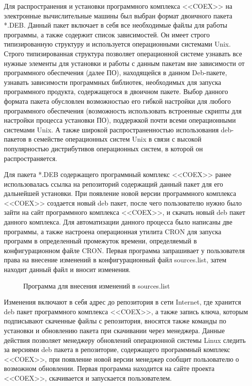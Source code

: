 Для распространения и установки программного комплекса <<COEX>> на электронные вычислительные машины был выбран формат двоичного пакета *.DEB. Данный пакет включает в себя все необходимые файлы для работы программы, а также содержит список зависимостей. Он имеет строго типизированную структуру и используется операционными системами Unix. Строго типизированная структура позволяет операционной системе узнавать все нужные элементы для установки и работы с данным пакетам вне зависимости от программного обеспечения (далее ПО), находящейся в данном Deb-пакете, узнавать зависимости программных библиотек, необходимых для запуска программного продукта, содержащегося в двоичном пакете.  Выбор данного формата пакета обусловлен возможностью его гибкой настройки для любого программного обеспечения (возможность использовать встроенные скрипты для настройки процесса установки ПО), поддержкой почти всеми операционными системами Unix. А также широкой распространенностью использования deb-пакетов в семействе операционных систем Unix в связи с высокой популярностью дистрибутивов операционных систем, в которой он распространяется.~\cite{tecmint}  

Для пакета *.DEB содержащего программный комплекс <<COEX>> ранее использовалась ссылка на репозиторий содержащий данный пакет для его дальнейшей установки. При появление новой версии программного комплекса <<COEX>> создается новый deb пакет, после чего пользователю нужно было зайти на сайт программного комплекса <<COEX>>, и скачать новый deb пакет данного комплекса. Для автоматизации данного процесса было написаны две программы, а также настроена операционная утилита CRON для запуска программ в определенный промежуток времени, определяемый в конфигурационном файле CRON. Первая программа запрашивает у пользователя права на внесение изменений в конфигурационный файл sources.list, затем находит данный файл и вносит изменения. 

\begin{figure}[!ht]
\caption{ Программа для внесения изменений в sources.list }
\label{ser_1:ser_1}
\end{figure}

Изменения включают в себя адрес до репозитория   в сети Internet, где хранится deb пакет программного комплекса <<COEX>>, а также запись ключа, которым подписывают скаченные файлы с репозитория, вносятся также команды по установки и обновлению пакета при скачивании через менеджера. Данные действия позволяет менеджеру обновлений операционной системы Linux следить за версиями deb пакета в репозиторие, содержащего программный комплекс <<COEX>>, при появление новой версии менеджер сообщит пользователю о возможном обновлении. Первая программа находится на сайте проекта <<COEX>>, скачивается и запускается пользователем. 

